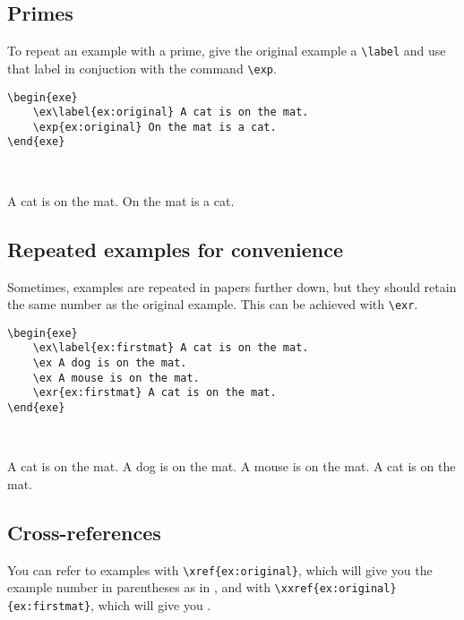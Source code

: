 \documentclass[output=paper]{langscibook}
\newcommand{\cmd}[1]{\texttt{\textbackslash#1}}
\begin{document}
\subsection{Primes}
To repeat an example with a prime, give the original example a \cmd{label} and use that label in conjuction with the command \cmd{exp}.

\noindent
\begin{minipage}[t]{.67\textwidth}
\begin{lstlisting}
\begin{exe}
    \ex\label{ex:original} A cat is on the mat.
    \exp{ex:original} On the mat is a cat.
\end{exe}
 \end{lstlisting}
\end{minipage}~
\parbox[t]{.33\textwidth}{
\begin{exe}
    \ex \label{ex:original} A cat is on the mat.
     On the mat is a cat.
\end{exe}
}

\subsection{Repeated examples for convenience}
Sometimes, examples are repeated in papers further down, but they should retain the same number as the original example. This can be achieved with \cmd{exr}.


\noindent
\begin{minipage}[t]{.55\textwidth}
\begin{lstlisting}
\begin{exe}
    \ex\label{ex:firstmat} A cat is on the mat.
    \ex A dog is on the mat.
    \ex A mouse is on the mat.
    \exr{ex:firstmat} A cat is on the mat.
\end{exe}
 \end{lstlisting}
\end{minipage}~
\parbox[t]{.45\textwidth}{
\begin{exe}
    \ex\label{ex:firstmat} A cat is on the mat.
    \ex A dog is on the mat.
    \ex A mouse is on the mat.
     A cat is on the mat.
\end{exe}
}


\subsection{Cross-references}
You can refer to examples with \cmd{xref\{ex:original\}}, which will give you the example number in parentheses as in , and with \cmd{xxref\{ex:original\}\{ex:firstmat\}}, which will give you .
\end{document}
